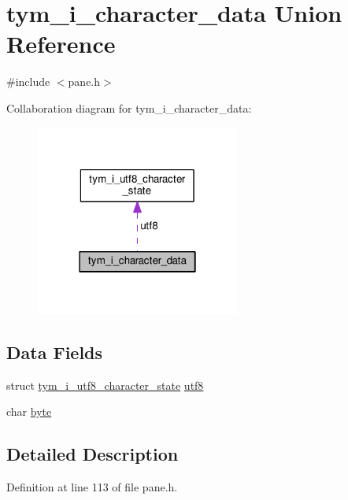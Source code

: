 \hypertarget{uniontym__i__character__data}{}\section{tym\+\_\+i\+\_\+character\+\_\+data Union Reference}
\label{uniontym__i__character__data}


{\ttfamily \#include $<$pane.\+h$>$}



Collaboration diagram for tym\+\_\+i\+\_\+character\+\_\+data\+:
\nopagebreak
\begin{figure}[H]
\begin{center}
\leavevmode
\includegraphics[width=190pt]{uniontym__i__character__data__coll__graph}
\end{center}
\end{figure}
\subsection*{Data Fields}
\begin{DoxyCompactItemize}
\item 
struct \hyperlink{structtym__i__utf8__character__state}{tym\+\_\+i\+\_\+utf8\+\_\+character\+\_\+state} \hyperlink{uniontym__i__character__data_ad0a8e001d32643615c5265e9af3b9079}{utf8}
\item 
char \hyperlink{uniontym__i__character__data_a128f7b66e5071854606106ee3801fafb}{byte}
\end{DoxyCompactItemize}


\subsection{Detailed Description}


Definition at line 113 of file pane.\+h.



